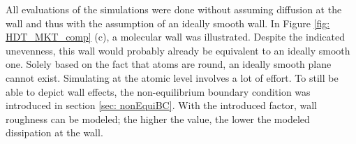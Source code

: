 All evaluations of the simulations were done without assuming diffusion at the wall and thus with the assumption of an ideally smooth wall. In Figure \ref{fig: HDT_MKT_comp} (c), a molecular wall was illustrated. Despite the indicated unevenness, this wall would probably already be equivalent to an ideally smooth one. Solely based on the fact that atoms are round, an ideally smooth plane cannot exist. Simulating at the atomic level involves a lot of effort. To still be able to depict wall effects, the non-equilibrium boundary condition was introduced in section \ref{sec: nonEquiBC}. With the introduced factor, wall roughness can be modeled; the higher the value, the lower the modeled dissipation at the wall.

